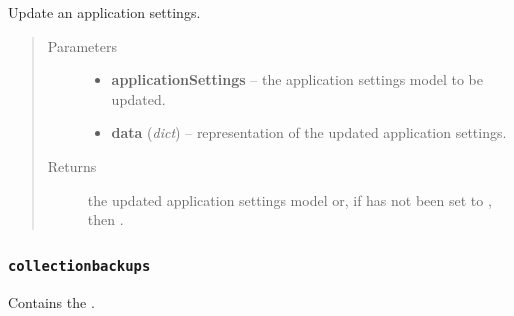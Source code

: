 \documentclass[letterpaper,10pt,english]{sphinxmanual}
\begin{document}

\begin{fulllineitems}
\label{api:onlinelinguisticdatabase.controllers.applicationsettings.updateApplicationSettings}
Update an application settings.
\begin{quote}\begin{description}
\item[{Parameters}] \leavevmode\begin{itemize}
\item {} 
\textbf{applicationSettings} -- the application settings model to be updated.

\item {} 
\textbf{data} (\emph{dict}) -- representation of the updated application settings.

\end{itemize}

\item[{Returns}] \leavevmode
the updated application settings model or, if  has not
been set to , then .

\end{description}\end{quote}

\end{fulllineitems}



\subsubsection{\texttt{collectionbackups}}
\label{api:collectionbackups}\label{api:module-onlinelinguisticdatabase.controllers.collectionbackups}
Contains the {\hyperref[api:onlinelinguisticdatabase.controllers.collectionbackups.CollectionbackupsController]{}}.
\label{api:module-collectionbackups}
\end{document}
